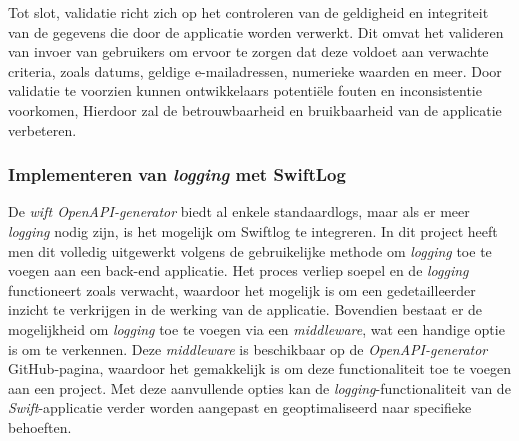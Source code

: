 Tot slot, validatie richt zich op het controleren van de geldigheid en integriteit van de gegevens die door de applicatie worden verwerkt. Dit omvat het valideren van invoer van gebruikers om ervoor te zorgen dat deze voldoet aan verwachte criteria, zoals datums, geldige e-mailadressen, numerieke waarden en meer. Door validatie te voorzien kunnen ontwikkelaars potentiële fouten en inconsistentie voorkomen, Hierdoor zal de betrouwbaarheid en bruikbaarheid van de applicatie verbeteren.

\subsubsection{Implementeren van \textit{logging} met SwiftLog}
De \textit{wift OpenAPI-generator} biedt al enkele standaardlogs, maar als er meer \textit{logging} nodig zijn, is het mogelijk om Swiftlog te integreren. In dit project heeft men dit volledig uitgewerkt volgens de gebruikelijke methode om \textit{logging} toe te voegen aan een back-end applicatie. Het proces verliep soepel en de \textit{logging} functioneert zoals verwacht, waardoor het mogelijk is om een gedetailleerder inzicht te verkrijgen in de werking van de applicatie.
Bovendien bestaat er de mogelijkheid om \textit{logging} toe te voegen via een \textit{middleware}, wat een handige optie is om te verkennen. Deze \textit{middleware} is beschikbaar op de \textit{ OpenAPI-generator} GitHub-pagina, waardoor het gemakkelijk is om deze functionaliteit toe te voegen aan een project. Met deze aanvullende opties kan de \textit{logging}-functionaliteit van de \textit{Swift}-applicatie verder worden aangepast en geoptimaliseerd naar specifieke behoeften.


